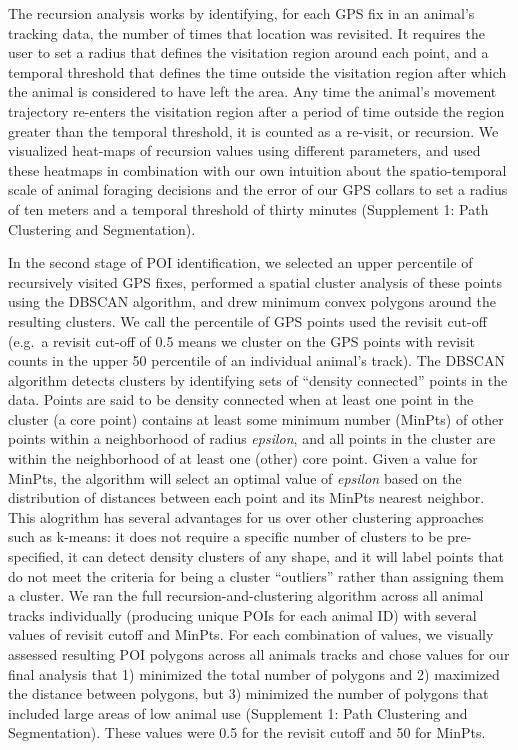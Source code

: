 \documentclass[twoside,12pt,final]{ucthesis-CA2012}
\begin{document}
\begin{ucmainmatter}
The recursion analysis works by identifying, for each GPS fix in an animal's tracking data, the number of times that location was revisited. It requires the user to set a radius that defines the visitation region around each point, and a temporal threshold that defines the time outside the visitation region after which the animal is considered to have left the area. Any time the animal's movement trajectory re-enters the visitation region after a period of time outside the region greater than the temporal threshold, it is counted as a re-visit, or recursion. We visualized heat-maps of recursion values using different parameters, and used these heatmaps in combination with our own intuition about the spatio-temporal scale of animal foraging decisions and the error of our GPS collars to set a radius of ten meters and a temporal threshold of thirty minutes (Supplement 1: Path Clustering and Segmentation).

In the second stage of POI identification, we selected an upper percentile of recursively visited GPS fixes, performed a spatial cluster analysis of these points using the DBSCAN algorithm, and drew minimum convex polygons around the resulting clusters. We call the percentile of GPS points used the revisit cut-off (e.g.~a revisit cut-off of 0.5 means we cluster on the GPS points with revisit counts in the upper 50 percentile of an individual animal's track). The DBSCAN algorithm detects clusters by identifying sets of ``density connected'' points in the data. Points are said to be density connected when at least one point in the cluster (a core point) contains at least some minimum number (MinPts) of other points within a neighborhood of radius \emph{epsilon}, and all points in the cluster are within the neighborhood of at least one (other) core point. Given a value for MinPts, the algorithm will select an optimal value of \emph{epsilon} based on the distribution of distances between each point and its MinPts nearest neighbor. This alogrithm has several advantages for us over other clustering approaches such as k-means: it does not require a specific number of clusters to be pre-specified, it can detect density clusters of any shape, and it will label points that do not meet the criteria for being a cluster ``outliers'' rather than assigning them a cluster. We ran the full recursion-and-clustering algorithm across all animal tracks individually (producing unique POIs for each animal ID) with several values of revisit cutoff and MinPts. For each combination of values, we visually assessed resulting POI polygons across all animals tracks and chose values for our final analysis that 1) minimized the total number of polygons and 2) maximized the distance between polygons, but 3) minimized the number of polygons that included large areas of low animal use (Supplement 1: Path Clustering and Segmentation). These values were 0.5 for the revisit cutoff and 50 for MinPts.


\end{ucmainmatter}
\end{document}
